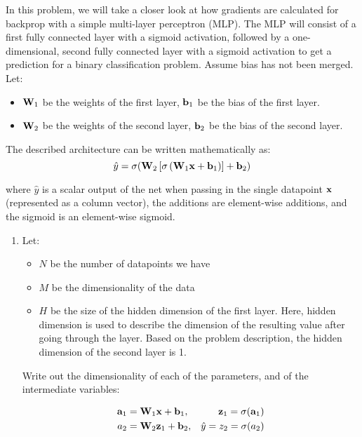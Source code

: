 \documentclass[submit]{harvardml}
\begin{document}
\newpage
\begin{problem}

  In this problem, we will take a closer look at how gradients are calculated for backprop with a simple multi-layer perceptron (MLP). The MLP will consist of a first fully connected layer with a sigmoid activation, followed by a one-dimensional, second fully connected layer with a sigmoid activation to get a prediction for a binary classification problem. Assume bias has not been merged. Let:
  \begin{itemize}
      \item $\bold{W}_1$ be the weights of the first layer, $\bold{b}_1$ be the bias of the first layer.
      \item $\bold{W}_2$ be the weights of the second layer, $\bold{b}_2$ be the bias of the second layer.
  \end{itemize}
  
  The described architecture can be written mathematically as: $$\hat{y} = \sigma(\bold{W}_2 \left[\sigma \left(\bold{W}_1 \bold{x} + \bold{b}_1\right)\right] + \bold{b}_2)$$
  
  where $\hat{y}$ is a scalar output of the net when passing in the single datapoint $\bold{x}$ (represented as a column vector), the additions are element-wise additions, and the sigmoid is an element-wise sigmoid.
  
  \begin{enumerate}
      \item Let:
      \begin{itemize}
          \item $N$ be the number of datapoints we have
          \item $M$ be the dimensionality of the data
          \item $H$ be the size of the hidden dimension of the first layer. Here, hidden dimension is used to describe the dimension of the resulting value after going through the layer. Based on the problem description, the hidden dimension of the second layer is 1.
      \end{itemize}
      
      Write out the dimensionality of each of the parameters, and of the intermediate variables:

          \begin{align*}
          \bold{a}_1 &= \bold{W}_1 \bold{x} + \bold{b}_1, 
          &\bold{z}_1 = \sigma(\bold{a}_1) \\
          a_2 &= \bold{W}_2 \bold{z}_1 + \bold{b}_2, 
          &\hat{y} = z_2 = \sigma(a_2)
          \end{align*}
          

\end{enumerate}
\end{problem}
\end{document}
